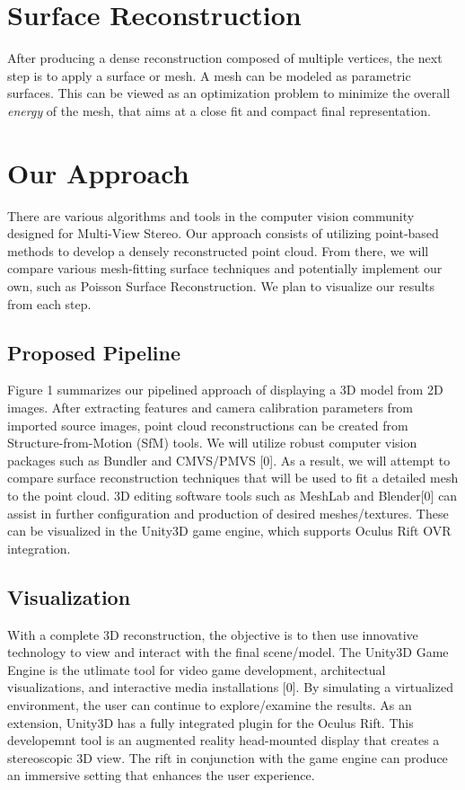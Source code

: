\documentclass[10pt,twocolumn,letterpaper]{article}
\begin{document}
\section{Surface Reconstruction}
After producing a dense reconstruction composed of multiple vertices, the next step is to apply a surface or mesh.  A mesh can be modeled as parametric surfaces.  This can be viewed as an optimization problem to minimize the overall \textit{energy} of the mesh, that aims at a close fit and compact final representation.



\section{Our Approach}
There are various algorithms and tools in the computer vision community designed for Multi-View Stereo.  Our approach consists of utilizing point-based methods to develop a densely reconstructed point cloud.  From there, we will compare various mesh-fitting surface techniques and potentially implement our own, such as Poisson Surface Reconstruction.  We plan to visualize our results from each step.

\subsection{Proposed Pipeline}
Figure 1 summarizes our pipelined approach of displaying a 3D model from 2D images.  After extracting features and camera calibration parameters from imported source images, point cloud reconstructions can be created from Structure-from-Motion (SfM) tools.  We will utilize robust computer vision packages such as Bundler and CMVS/PMVS [0].  As a result, we will attempt to compare surface reconstruction techniques that will be used to fit a detailed mesh to the point cloud.  3D editing software tools such as MeshLab and Blender[0] can assist in further configuration and production of desired meshes/textures.  These can be visualized in the Unity3D game engine, which supports Oculus Rift OVR integration.


\subsection{Visualization}
With a complete 3D reconstruction, the objective is to then use innovative technology to view and interact with the final scene/model. The Unity3D Game Engine is the utlimate tool for video game development, architectual visualizations, and interactive media installations [0].  By simulating a virtualized environment, the user can continue to explore/examine the results.  As an extension, Unity3D has a fully integrated plugin for the Oculus Rift.  This developemnt tool is an augmented reality head-mounted display that creates a stereoscopic 3D view.  The rift in conjunction with the game engine can produce an immersive setting that enhances the user experience.
\end{document}

